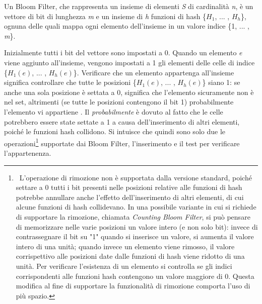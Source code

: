 \documentclass[../main.tex]{subfiles}
\begin{document}
\theoremstyle{definition}
\begin{definition} 

Un Bloom Filter, che rappresenta un insieme di elementi \textit{S} di cardinalità \textit{n}, è un vettore di bit di lunghezza \textit{m} e un insieme di \textit{h} funzioni di hash \{$H_{1}$, ... , $H_{h}$\}, ognuna delle quali mappa ogni elemento dell'insieme in un valore indice \{1, ... , \textit{m}\}. 

\end{definition}

\noindent
Inizialmente tutti i bit del vettore sono impostati a 0. Quando un elemento \textit{e} viene aggiunto all'insieme, vengono impostati a 1 gli elementi delle celle di indice \{$H_{1}(e)$, ... , $H_{h}(e)$\}. Verificare che un elemento appartenga all'insieme significa controllare che tutte le posizioni \{$H_{1}(e)$, ... , $H_{h}(e)$\} siano 1: se anche una sola posizione è settata a 0, significa che l'elemento sicuramente non è nel set, altrimenti (se tutte le posizioni contengono il bit 1) probabilmente l'elemento vi appartiene \cite{compressedbloomfilter}. Il \textit{probabilmente} è dovuto al fatto che le celle potrebbero essere state settate a 1 a causa dell'inserimento di altri elementi, poiché le funzioni hash collidono. Si intuisce che quindi sono solo due le operazioni\footnote{\ L'operazione di rimozione non è supportata dalla versione standard, poiché settare a 0 tutti i bit presenti nelle posizioni relative alle funzioni di hash potrebbe annullare anche l'effetto dell'inserimento di altri elementi, di cui alcune funzioni di hash collidevano. In una possibile variante in cui si richiede di supportare la rimozione, chiamata \textit{Counting Bloom Filter}, si può pensare di memorizzare nelle varie posizioni un valore intero (e non solo bit): invece di contrassegnare il bit su "1" quando si inserisce un valore, si aumenta il valore intero di una unità; quando invece un elemento viene rimosso, il valore corrispettivo alle posizioni date dalle funzioni di hash viene ridotto di una unità. Per verificare l'esistenza di un elemento si controlla se gli indici corrispondenti alle funzioni hash contengono un valore maggiore di 0. Questa modifica al fine di supportare la funzionalità di rimozione comporta l'uso di più spazio.} supportate dai Bloom Filter, l'inserimento e il test per verificare l'appartenenza.
\end{document}
